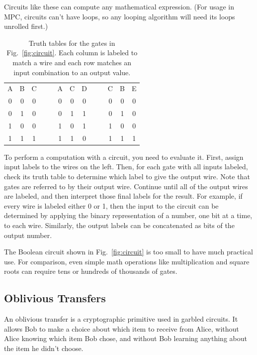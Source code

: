 Circuits like these can compute any mathematical expression. (For usage in MPC, circuits can't have loops, so any looping algorithm will need its loops unrolled first.)

\begin{table}[ht]
	\centering %
	\begin{tabular}{cc|c   cc   cc|c   cc   cc|c}
		A & B & C   &&&   A & C & D   &&&   C & B & E \\
		\cmidrule{1-3}    \cmidrule{6-8}    \cmidrule{11-13}
		0 & 0 & 0   &&&   0 & 0 & 0   &&&   0 & 0 & 0 \\
		0 & 1 & 0   &&&   0 & 1 & 1   &&&   0 & 1 & 0 \\
		1 & 0 & 0   &&&   1 & 0 & 1   &&&   1 & 0 & 0 \\
		1 & 1 & 1   &&&   1 & 1 & 0   &&&   1 & 1 & 1 \\
	\end{tabular}
	\caption{Truth tables for the gates in Fig.~\ref{fig:circuit}. Each column is labeled to match a wire and each row matches an input combination to an output value.}%
	\label{tab:truth-table}
\end{table}

To perform a computation with a circuit, you need to evaluate it. First, assign input labels to the wires on the left. Then, for each gate with all inputs labeled, check its truth table to determine which label to give the output wire. Note that gates are referred to by their output wire. Continue until all of the output wires are labeled, and then interpret those final labels for the result. For example, if every wire is labeled either 0 or 1, then the input to the circuit can be determined by applying the binary representation of a number, one bit at a time, to each wire. Similarly, the output labels can be concatenated as bits of the output number.

The Boolean circuit shown in Fig.~\ref{fig:circuit} is too small to have much practical use. For comparison, even simple math operations like multiplication and square roots can require tens or hundreds of thousands of gates\cite{bristol}.

\subsection{Oblivious Transfers}
An oblivious transfer is a cryptographic primitive used in garbled circuits. It allows Bob to make a choice about which item to receive from Alice, without Alice knowing which item Bob chose, and without Bob learning anything about the item he didn't choose. 

